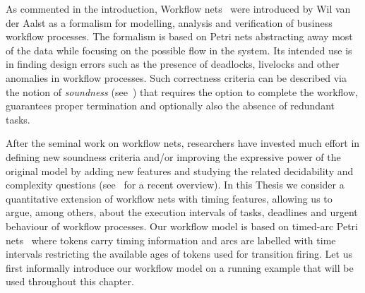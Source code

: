 As commented in the introduction, Workflow nets~\cite{Aalst97,Aalst98} were introduced 
by Wil van der Aalst as a formalism
for modelling, analysis and verification of business workflow processes.
The formalism is based on Petri nets abstracting away most of the data 
while focusing on the possible flow in the system. 
Its intended use is in finding design errors 
such as the presence of deadlocks, livelocks 
and other anomalies in workflow processes. Such correctness criteria can
be described via the notion of \emph{soundness} (see~\cite{AalstHHSVVW11}) that
requires the option to complete the workflow, guarantees proper termination
and optionally also the absence of redundant tasks. 

After the seminal work on workflow nets, researchers have 
invested much effort in defining new soundness criteria and/or 
improving the expressive power of the original model by adding new features 
and studying the related decidability and 
complexity questions
(see~\cite{AalstHHSVVW11} for a recent overview).
In this Thesis we consider a quantitative extension of workflow 
nets with timing features, allowing us to argue, among others, 
about the execution intervals of tasks, deadlines and urgent behaviour of workflow processes. Our workflow
model is based on timed-arc Petri nets~\cite{BLT:90,Hanisch:93} 
where tokens carry timing information
and arcs are labelled with time intervals restricting the available
ages of tokens used for transition firing. %
Let us first informally introduce 
our workflow model on a running example that will be used throughout this chapter.

